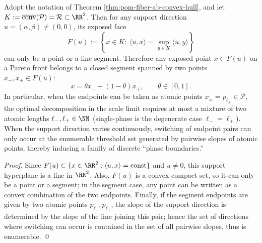 \begin{corollary}\label{cor:pom-fiber-ab-two-phase-mixing}
Adopt the notation of Theorem \ref{thm:pom-fiber-ab-convex-hull}, and let \(K:=\overline{\mathrm{conv}}(\mathcal P)=\mathcal R\subset\RR^2\).
Then for any support direction \(u=(\alpha,\beta)\neq(0,0)\), its exposed face
\[
F(u):=\left\{x\in K:\ \langle u,x\rangle=\sup_{y\in K}\langle u,y\rangle\right\}
\]
can only be a point or a line segment.
Therefore any exposed point \(x\in F(u)\) on a Pareto front belongs to a closed segment spanned by two points \(x_-,x_+\in F(u)\):
\[
x=\theta x_-+(1-\theta)x_+,\qquad \theta\in[0,1].
\]
In particular, when the endpoints can be taken as atomic points \(x_\pm=p_{\ell_\pm}\in\mathcal P\), the optimal decomposition in the scale limit requires at most a mixture of two atomic lengths \(\ell_-,\ell_+\in\NN\) (single-phase is the degenerate case \(\ell_-=\ell_+\)).
When the support direction varies continuously, switching of endpoint pairs can only occur at the enumerable threshold set generated by pairwise slopes of atomic points, thereby inducing a family of discrete ``phase boundaries.''
\end{corollary}
\begin{proof}
Since \(F(u)\subset\{x\in\RR^2:\langle u,x\rangle=\mathrm{const}\}\) and \(u\neq 0\), this support hyperplane is a line in \(\RR^2\).
Also, \(F(u)\) is a convex compact set, so it can only be a point or a segment; in the segment case, any point can be written as a convex combination of the two endpoints.
Finally, if the segment endpoints are given by two atomic points \(p_{\ell_-},p_{\ell_+}\), the slope of the support direction is determined by the slope of the line joining this pair; hence the set of directions where switching can occur is contained in the set of all pairwise slopes, thus is enumerable.
\qed
\end{proof}

